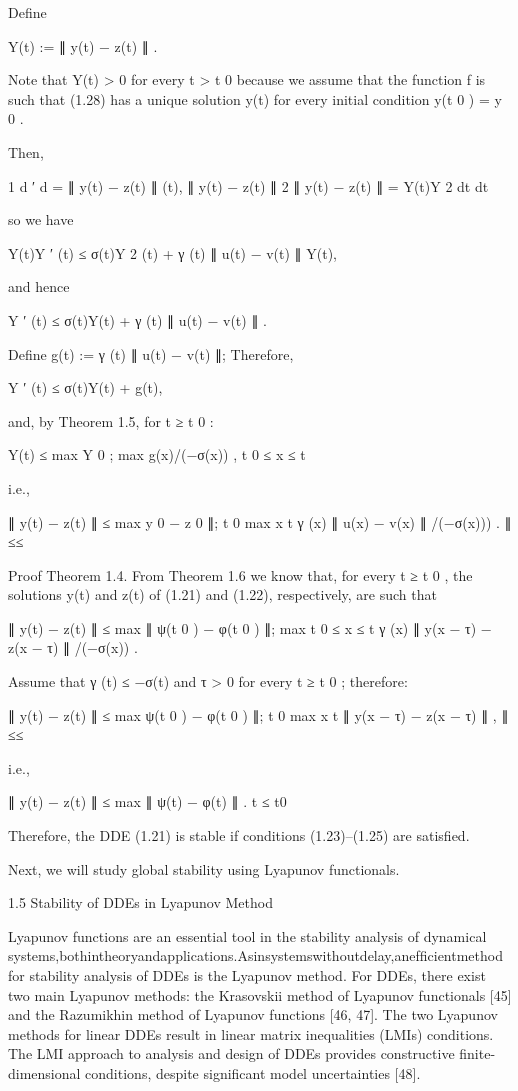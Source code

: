 \documentclass[12pt]{article}
\begin{document}
Deﬁne

Y(t) := ∥ y(t) − z(t) ∥ .

Note that Y(t) > 0 for every t > t 0 because we assume that the function f is such that (1.28) has a unique solution y(t) for every initial 
condition y(t 0 ) = y 0 .

Then,

1 d ′ d = ∥ y(t) − z(t) ∥ (t), ∥ y(t) − z(t) ∥ 2 ∥ y(t) − z(t) ∥ = Y(t)Y 2 dt dt

so we have

Y(t)Y ′ (t) ≤ σ(t)Y 2 (t) + γ (t) ∥ u(t) − v(t) ∥ Y(t),

and hence

Y ′ (t) ≤ σ(t)Y(t) + γ (t) ∥ u(t) − v(t) ∥ .

Deﬁne g(t) := γ (t) ∥ u(t) − v(t) ∥; Therefore,

Y ′ (t) ≤ σ(t)Y(t) + g(t),

and, by Theorem 1.5, for t ≥ t 0 :

Y(t) ≤ max Y 0 ; max g(x)/(−σ(x)) , { t 0 ≤ x ≤ t }

i.e.,

∥ y(t) − z(t) ∥ ≤ max y 0 − z 0 ∥; t 0 max x t { γ (x) ∥ u(x) − v(x) ∥ /(−σ(x))) } . ∥ { ≤≤ }

Proof Theorem 1.4. From Theorem 1.6 we know that, for every t ≥ t 0 , the solutions y(t) and z(t) of (1.21) and (1.22), respectively, are 
such that

∥ y(t) − z(t) ∥ ≤ max { ∥ ψ(t 0 ) − φ(t 0 ) ∥; max t 0 ≤ x ≤ t γ (x) ∥ y(x − τ) − z(x − τ) ∥ /(−σ(x)) } .

Assume that γ (t) ≤ −σ(t) and τ > 0 for every t ≥ t 0 ; therefore:

∥ y(t) − z(t) ∥ ≤ max ψ(t 0 ) − φ(t 0 ) ∥; t 0 max x t ∥ y(x − τ) − z(x − τ) ∥ , ∥ { ≤≤ }

i.e.,

∥ y(t) − z(t) ∥ ≤ max {∥ ψ(t) − φ(t) ∥} . t ≤ t0 

Therefore, the DDE (1.21) is stable if conditions (1.23)–(1.25) are satisﬁed.

Next, we will study global stability using Lyapunov functionals.

1.5 Stability of DDEs in Lyapunov Method

Lyapunov functions are an essential tool in the stability analysis of dynamical 
systems,bothintheoryandapplications.Asinsystemswithoutdelay,anefﬁcientmethod for stability analysis of DDEs is the Lyapunov method. For 
DDEs, there exist two main Lyapunov methods: the Krasovskii method of Lyapunov functionals [45] and the Razumikhin method of Lyapunov 
functions [46, 47]. The two Lyapunov methods for linear DDEs result in linear matrix inequalities (LMIs) conditions. The LMI approach to 
analysis and design of DDEs provides constructive ﬁnite-dimensional conditions, despite signiﬁcant model uncertainties [48].
\end{document}
